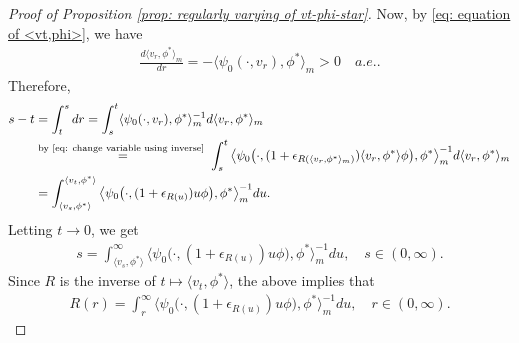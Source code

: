 \documentclass[UTF8]{pkuthss}
\theoremstyle{plain}
\theoremstyle{definition}
\numberwithin{equation}{section}
\begin{document}
\begin{proof}[Proof of Proposition \ref{prop: regularly varying of vt-phi-star}]
	Now, by \eqref{eq: equation of <vt,phi>}, we have
\begin{align}
	\frac{d \langle v_r, \phi^* \rangle_m}{dr}
	= - \langle \psi_0(\cdot ,v_r) ,\phi^*\rangle_m
	> 0
	\quad a.e..
\end{align}
	Therefore,
\begin{align}
	s-t
	& = \int_t^s dr
	= \int_s^t \langle \psi_0(\cdot ,v_r), \phi^*\rangle _m^{-1} d\langle v_r ,\phi^* \rangle_m
	\\&\overset{\text{by \eqref{eq: change variable using inverse} }}{=} \int_s^t \big\langle \psi_0\big( \cdot ,(1+ \epsilon_{R(\langle v_r,\phi^* \rangle_m)})\langle v_r,\phi^*\rangle \phi \big), \phi^* \big \rangle _m^{-1} d\langle v_r ,\phi^* \rangle_m
	\\&= \int_{\langle v_s,\phi^*\rangle}^{\langle v_t, \phi^* \rangle} \big\langle \psi_0 \big( \cdot ,( 1 + \epsilon_{R(u)} ) u \phi \big), \phi^* \big\rangle_m^{-1} du.
\end{align}
	Letting $t\to 0$, we get
\begin{align}
	s
	= \int_{\langle v_s,\phi^*\rangle}^\infty \big\langle \psi_0 \big(\cdot ,( 1 + \epsilon_{R(u)} ) u \phi \big), \phi^* \big\rangle_m^{-1} du,
	\quad s\in (0,\infty).
\end{align}
	Since $R$ is the inverse of $t\mapsto \langle v_t,\phi^*\rangle$, the above implies that
\begin{align}\label{eq: integral equation for R}
	R(r)
	= \int_r^\infty \big\langle \psi_0 \big(\cdot ,( 1 + \epsilon_{R(u)} ) u \phi \big), \phi^* \big\rangle_m^{-1} du,
	\quad r\in (0,\infty).
\end{align}
	

\end{proof}
\end{document}
